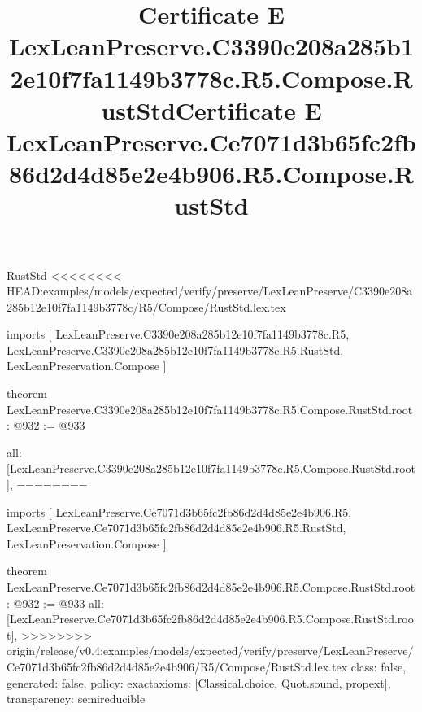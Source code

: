 \begin{lexlean}{RustStd}
<<<<<<<< HEAD:examples/models/expected/verify/preserve/LexLeanPreserve/C3390e208a285b12e10f7fa1149b3778c/R5/Compose/RustStd.lex.tex
\title{Certificate E LexLeanPreserve.C3390e208a285b12e10f7fa1149b3778c.R5.Compose.RustStd}
\begin{coremodule}
imports [
  LexLeanPreserve.C3390e208a285b12e10f7fa1149b3778c.R5,
  LexLeanPreserve.C3390e208a285b12e10f7fa1149b3778c.R5.RustStd,
  LexLeanPreservation.Compose
]

theorem LexLeanPreserve.C3390e208a285b12e10f7fa1149b3778c.R5.Compose.RustStd.root : @932 := @933 {
  all: [LexLeanPreserve.C3390e208a285b12e10f7fa1149b3778c.R5.Compose.RustStd.root],
========
\title{Certificate E LexLeanPreserve.Ce7071d3b65fc2fb86d2d4d85e2e4b906.R5.Compose.RustStd}
\begin{coremodule}
imports [
  LexLeanPreserve.Ce7071d3b65fc2fb86d2d4d85e2e4b906.R5,
  LexLeanPreserve.Ce7071d3b65fc2fb86d2d4d85e2e4b906.R5.RustStd,
  LexLeanPreservation.Compose
]

theorem LexLeanPreserve.Ce7071d3b65fc2fb86d2d4d85e2e4b906.R5.Compose.RustStd.root : @932 := @933 {
  all: [LexLeanPreserve.Ce7071d3b65fc2fb86d2d4d85e2e4b906.R5.Compose.RustStd.root],
>>>>>>>> origin/release/v0.4:examples/models/expected/verify/preserve/LexLeanPreserve/Ce7071d3b65fc2fb86d2d4d85e2e4b906/R5/Compose/RustStd.lex.tex
  class: false,
  generated: false,
  policy: exact{axioms: [Classical.choice, Quot.sound, propext]},
  transparency: semireducible
}


\end{coremodule}}
\end{coremodule}
\end{lexlean}
